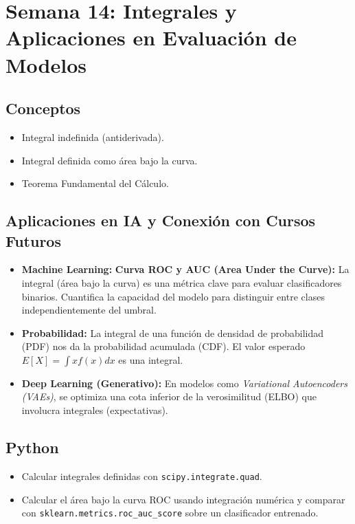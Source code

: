 \documentclass[12pt,a4paper,openany,oneside]{book}
\begin{document}
\section{Semana 14: Integrales y Aplicaciones en Evaluación de Modelos}

\subsection{Conceptos}
\begin{itemize}
    \item Integral indefinida (antiderivada).
    \item Integral definida como área bajo la curva.
    \item Teorema Fundamental del Cálculo.
\end{itemize}

\subsection{Aplicaciones en IA y Conexión con Cursos Futuros}
\begin{itemize}
    \item \textbf{Machine Learning:} \textbf{Curva ROC y AUC (Area Under the Curve):} La integral (área bajo la curva) es una métrica clave para evaluar clasificadores binarios. Cuantifica la capacidad del modelo para distinguir entre clases independientemente del umbral.
    \item \textbf{Probabilidad:} La integral de una función de densidad de probabilidad (PDF) nos da la probabilidad acumulada (CDF). El valor esperado \(E[X] = \int x f(x) dx\) es una integral.
    \item \textbf{Deep Learning (Generativo):} En modelos como \textit{Variational Autoencoders (VAEs)}, se optimiza una cota inferior de la verosimilitud (ELBO) que involucra integrales (expectativas).
\end{itemize}

\subsection{Python}
\begin{itemize}
    \item Calcular integrales definidas con \texttt{scipy.integrate.quad}.
    \item Calcular el área bajo la curva ROC usando integración numérica y comparar con \texttt{sklearn.metrics.roc\_auc\_score} sobre un clasificador entrenado.
\end{itemize}
\end{document}
